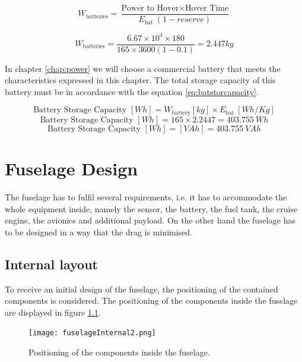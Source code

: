 \documentclass[english,fira]{ist-report}
\begin{document}
\begin{equation}\label{eq:wbatteries}
    W_{\text{batteries}}=\frac{\text{Power to Hover} \times \text{Hover Time} }{E_{\text{bat}}\ (1-reserve)}
\end{equation}

\begin{equation*}
    W_{\text{batteries}}=\frac{6.67\times{10}^3\times180}{165\times3600(1-0.1)}=2.447 kg
\end{equation*}

In chapter \ref{chap:power} we will choose a commercial battery that meets the characteristics expressed in this chapter. The total storage capacity of this battery must be in accordance with the equation \ref{eq:batstorcapacity}.

\begin{equation} \label{eq:batstorcapacity}
    \text{Battery Storage Capacity } [Wh]=W_{\text{battery}}[kg]\times E_{\text{bat}}\ [Wh/Kg] 
\end{equation}
\begin{equation*}
    \text{Battery Storage Capacity } [Wh]= 165\times2.2447=403.755 \ Wh
\end{equation*}
\begin{equation*}
    \text{Battery Storage Capacity } [Wh]=\left[VAh\right]=403.755 \ VAh
\end{equation*}




\chapter{Fuselage Design}

The fuselage has to fulfil several requirements, i.e. it has to accommodate the whole equipment inside, namely the sensor, the battery, the fuel tank, the cruise engine, the avionics and additional payload. On the other hand the fuselage has to be designed in a way that the drag is minimised.

\section{Internal layout}

To receive an initial design of the fuselage, the positioning of the contained components is considered. The positioning of the components inside the fuselage are displayed in figure \ref{fig:fuseInt2}.

\begin{figure}[ht]
	\centering
	\texttt{[image: fuselageInternal2.png]}
	\caption{Positioning of the components inside the fuselage.}
	\label{fig:fuseInt2}
\end{figure}
\end{document}
